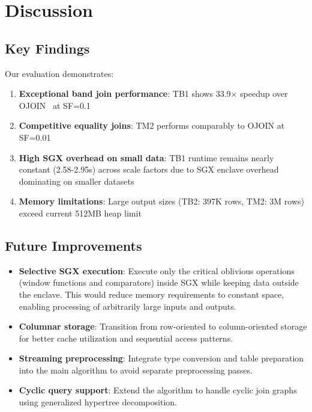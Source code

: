 \section{Discussion}

\subsection{Key Findings}

Our evaluation demonstrates:

\begin{enumerate}
\item \textbf{Exceptional band join performance}: TB1 shows 33.9× speedup over OJOIN~\cite{hu2025optimal} at SF=0.1
\item \textbf{Competitive equality joins}: TM2 performs comparably to OJOIN at SF=0.01
\item \textbf{High SGX overhead on small data}: TB1 runtime remains nearly constant (2.58-2.95s) across scale factors due to SGX enclave overhead dominating on smaller datasets
\item \textbf{Memory limitations}: Large output sizes (TB2: 397K rows, TM2: 3M rows) exceed current 512MB heap limit
\end{enumerate}

\subsection{Future Improvements}

\begin{itemize}
\item \textbf{Selective SGX execution}: Execute only the critical oblivious operations (window functions and comparators) inside SGX while keeping data outside the enclave. This would reduce memory requirements to constant space, enabling processing of arbitrarily large inputs and outputs.
\item \textbf{Columnar storage}: Transition from row-oriented to column-oriented storage for better cache utilization and sequential access patterns.
\item \textbf{Streaming preprocessing}: Integrate type conversion and table preparation into the main algorithm to avoid separate preprocessing passes.
\item \textbf{Cyclic query support}: Extend the algorithm to handle cyclic join graphs using generalized hypertree decomposition.
\end{itemize}

